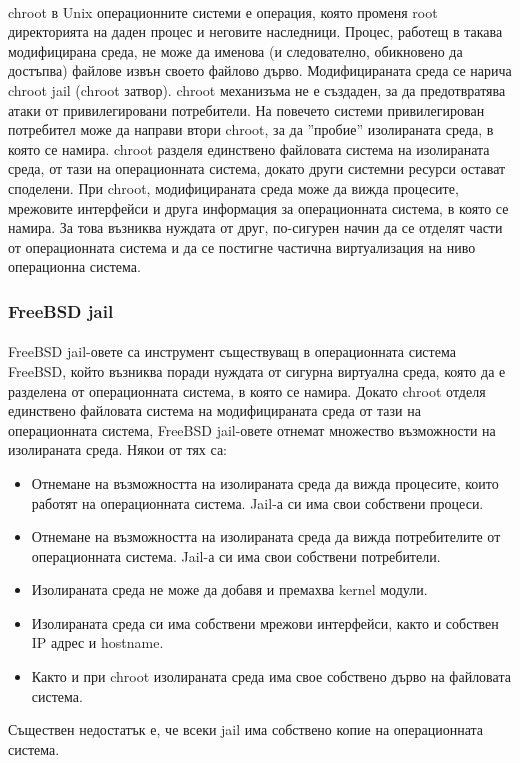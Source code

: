 \documentclass[pdftex,14pt,a4paper]{extreport}
\begin{document}
\paragraph {}
chroot в Unix операционните системи е операция, която променя root директорията на даден процес и неговите наследници. Процес, работещ в такава модифицирана среда, не може да именова (и следователно, обикновено да достъпва) файлове извън своето файлово дърво. Модифицираната среда се нарича chroot jail (chroot затвор). chroot механизъма не е създаден, за да предотвратява атаки от привилегировани потребители. На повечето системи привилегирован потребител може да направи втори chroot, за да ''пробие'' изолираната среда, в която се намира. chroot разделя единствено файловата система на изолираната среда, от тази на операционната система, докато други системни ресурси остават споделени. При chroot, модифицираната среда може да вижда процесите, мрежовите интерфейси и друга информация за операционната система, в която се намира. За това възниква нуждата от друг, по-сигурен начин да се отделят части от операционната система и да се постигне частична виртуализация на ниво операционна система.
\subsubsection {FreeBSD jail}
\paragraph {}
FreeBSD jail-овете са инструмент съществуващ в операционната система FreeBSD, който възниква поради нуждата от сигурна виртуална среда, която да е разделена от операционната система, в която се намира. Докато chroot отделя единствено файловата система на модифицираната среда от тази на операционната система, FreeBSD jail-овете отнемат множество възможности на изолираната среда. Някои от тях са:
\begin{itemize}
  \item Отнемане на възможността на изолираната среда да вижда процесите, които работят на операционната система. Jail-а си има свои собствени процеси.
  \item Отнемане на възможността на изолираната среда да вижда потребителите от операционната система. Jail-а си има свои собствени потребители.
  \item Изолираната среда не може да добавя и премахва kernel модули.
  \item Изолираната среда си има собствени мрежови интерфейси, както и собствен IP адрес и hostname.
  \item Както и при chroot изолираната среда има свое собствено дърво на файловата система.
\end{itemize}
Съществен недостатък е, че всеки jail има собствено копие на операционната система.
\end{document}

